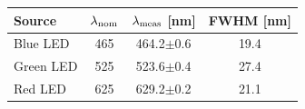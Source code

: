 \begin{tabular}{@{}lccc@{}}
\toprule
Source & $\lambda_{\rm nom}$ & $\lambda_{\rm meas}$ [nm] & FWHM [nm] \\
\midrule
Blue LED & 465 & 464.2$\pm$0.6 & 19.4 \\
Green LED & 525 & 523.6$\pm$0.4 & 27.4 \\
Red LED & 625 & 629.2$\pm$0.2 & 21.1 \\
\bottomrule
\end{tabular}
